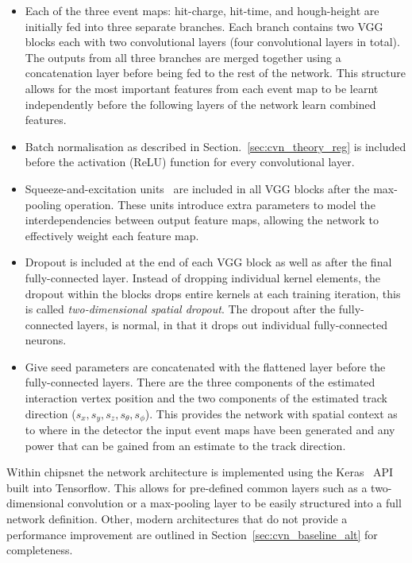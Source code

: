 \begin{itemize}
    \item Each of the three event maps: hit-charge, hit-time, and hough-height are initially fed
          into three separate branches. Each branch contains two VGG blocks each with two
          convolutional layers (four convolutional layers in total). The outputs from all three
          branches are merged together using a concatenation layer before being fed to the rest of
          the network. This structure allows for the most important features from each event map
          to be learnt independently before the following layers of the network learn combined
          features.

    \item Batch normalisation as described in Section.~\ref{sec:cvn_theory_reg} is included before
          the activation (ReLU) function for every convolutional layer.

    \item Squeeze-and-excitation units~\cite{hu2018} are included in all VGG blocks after the
          max-pooling operation. These units introduce extra parameters to model the
          interdependencies between output feature maps, allowing the network to effectively
          weight each feature map.

    \item Dropout is included at the end of each VGG block as well as after the final
          fully-connected layer. Instead of dropping individual kernel elements, the dropout
          within the blocks drops entire kernels at each training iteration, this is called
          \emph{two-dimensional spatial dropout}. The dropout after the fully-connected layers, is
          normal, in that it drops out individual fully-connected neurons.

    \item Give seed parameters are concatenated with the flattened layer before the
          fully-connected layers. There are the three components of the estimated interaction
          vertex position and the two components of the estimated track direction ($s_{x},s_{y},
              s_{z},s_{\theta},s_{\phi}$). This provides the network with spatial context as to where
          in the detector the input event maps have been generated and any power that can be
          gained from an estimate to the track direction.
\end{itemize}

Within chipsnet the network architecture is implemented using the Keras~\cite{chollet2015} API
built into Tensorflow. This allows for pre-defined common layers such as a two-dimensional
convolution or a max-pooling layer to be easily structured into a full network definition. Other,
modern architectures that do not provide a performance improvement are outlined in
Section~\ref{sec:cvn_baseline_alt} for completeness.

